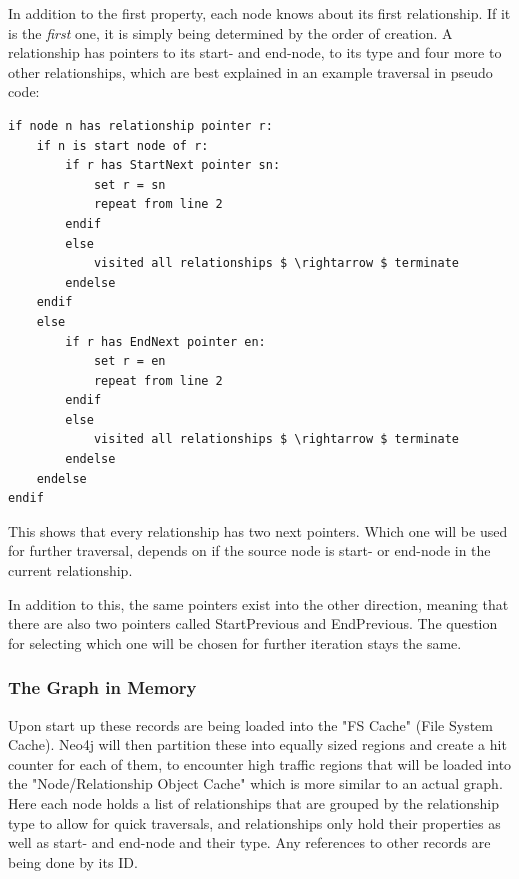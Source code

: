 In addition to the first property, each node knows about its first relationship. If it is the \emph{first} one, it is simply being determined by the order of creation. A relationship has pointers to its start- and end-node, to its type and four more to other relationships, which are best explained in an example traversal in pseudo code:
\lstset{language=JavaScript}
\begin{lstlisting}[caption={Algorithm to Save Read the Graph from Disk}]
if node n has relationship pointer r: 
	if n is start node of r: 
		if r has StartNext pointer sn: 
			set r = sn 
			repeat from line 2 
		endif 
		else  
			visited all relationships $ \rightarrow $ terminate
		endelse 
	endif 
	else 
		if r has EndNext pointer en: 
			set r = en 
			repeat from line 2 
		endif 
		else
			visited all relationships $ \rightarrow $ terminate
		endelse 
	endelse 
endif
\end{lstlisting}

This shows that every relationship has two next pointers. Which one will be used for further traversal, depends on if the source node is start- or end-node in the current relationship.

In addition to this, the same pointers exist into the other direction, meaning that there are also two pointers called StartPrevious and EndPrevious. The question for selecting which one will be chosen for further iteration stays the same.

\subsubsection{The Graph in Memory}
Upon start up these records are being loaded into the "FS Cache" (File System Cache). Neo4j will then partition these into equally sized regions and create a hit counter for each of them, to encounter high traffic regions that will be loaded into the "Node/Relationship Object Cache" which is more similar to an actual graph. \\
Here each node holds a list of relationships that are grouped by the relationship type to allow for quick traversals, and relationships only hold their properties as well as start- and end-node and their type. Any references to other records are being done by its ID. 


